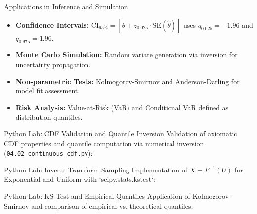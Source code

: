 \documentclass[aspectratio=169,xcolor={dvipsnames,table}]{beamer}
\begin{document}
\begin{frame}{Applications in Inference and Simulation}
	\vspace{-0.1cm}
	\begin{itemize}\itemsep=0.1cm
		\item \textbf{Confidence Intervals:} $\text{CI}_{95\%} = [\hat{\theta} \pm z_{0.025} \cdot \text{SE}(\hat{\theta})]$ uses $q_{0.025} = -1.96$ and $q_{0.975} = 1.96$. \pause
		\item \textbf{Monte Carlo Simulation:} Random variate generation via inversion for uncertainty propagation. \pause
		\item \textbf{Non-parametric Tests:} Kolmogorov-Smirnov and Anderson-Darling for model fit assessment. \pause
		\item \textbf{Risk Analysis:} Value-at-Risk (VaR) and Conditional VaR defined as distribution quantiles.
	\end{itemize}
\end{frame}

\begin{frame}[fragile]{Python Lab: CDF Validation and Quantile Inversion}
	\vspace{-0.05cm}
	\scriptsize
	Validation of axiomatic CDF properties and quantile computation via numerical inversion (\texttt{04.02\_continuous\_cdf.py}):
	\vspace{0.02cm}
	{
	}
\end{frame}

\begin{frame}[fragile]{Python Lab: Inverse Transform Sampling}
	\vspace{-0.05cm}
	\scriptsize
	Implementation of $X = F^{-1}(U)$ for Exponential and Uniform with `scipy.stats.kstest`:
	\vspace{0.02cm}
	{
	}
\end{frame}

\begin{frame}[fragile]{Python Lab: KS Test and Empirical Quantiles}
	\vspace{-0.05cm}
	\scriptsize
	Application of Kolmogorov-Smirnov and comparison of empirical vs. theoretical quantiles:
	\vspace{0.02cm}
	{
	}
\end{frame}
\end{document}
